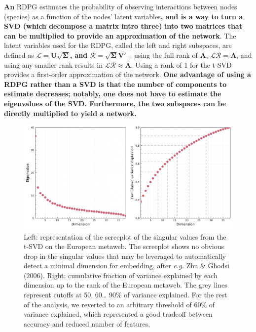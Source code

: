 \documentclass[11pt]{article}
\makeatletter
\def\maxwidth{\ifdim\Gin@nat@width>\linewidth\linewidth
\else\Gin@nat@width\fi}
\let\Oldincludegraphics\includegraphics
\renewcommand{\includegraphics}[1]{\Oldincludegraphics[width=\maxwidth]{#1}}
\providecommand{\DIFaddtex}[1]{{\bf #1}} %
\providecommand{\DIFdeltex}[1]{} %
\providecommand{\DIFaddbegin}{\protect\color{blue}} %
\providecommand{\DIFaddend}{\protect\color{black}} %
\providecommand{\DIFdelbegin}{\protect\color{red}} %
\providecommand{\DIFdelend}{\protect\color{black}} %
\providecommand{\DIFadd}[1]{\texorpdfstring{\DIFaddtex{#1}}{#1}} %
\providecommand{\DIFdel}[1]{\texorpdfstring{\DIFdeltex{#1}}{}} %
\newcommand{\DIFscaledelfig}{0.5}
\newlength{\DIFdelgraphicswidth} %
\newlength{\DIFdelgraphicsheight} %
\newcommand{\DIFaddincludegraphics}[2][]{{\color{blue}\fbox{\DIFOincludegraphics[#1]{#2}}}} %
\newcommand{\DIFdelincludegraphics}[2][]{%
\sbox{\DIFdelgraphicsbox}{\DIFOincludegraphics[#1]{#2}}%
\settoboxwidth{\DIFdelgraphicswidth}{\DIFdelgraphicsbox} %
\settoboxtotalheight{\DIFdelgraphicsheight}{\DIFdelgraphicsbox} %
\scalebox{\DIFscaledelfig}{%
\parbox[b]{\DIFdelgraphicswidth}{\usebox{\DIFdelgraphicsbox}\\[-\baselineskip] \rule{\DIFdelgraphicswidth}{0em}}\llap{\resizebox{\DIFdelgraphicswidth}{\DIFdelgraphicsheight}{%
\setlength{\unitlength}{\DIFdelgraphicswidth}%
\begin{picture}(1,1)%
\thicklines\linethickness{2pt} %
{\color[rgb]{1,0,0}\put(0,0){\framebox(1,1){}}}%
{\color[rgb]{1,0,0}\put(0,0){\line( 1,1){1}}}%
{\color[rgb]{1,0,0}\put(0,1){\line(1,-1){1}}}%
\end{picture}%
}\hspace*{3pt}}} %
} %
\DeclareRobustCommand{\DIFaddbegin}{\DIFOaddbegin \let\includegraphics\DIFaddincludegraphics} %
\DeclareRobustCommand{\DIFaddend}{\DIFOaddend \let\includegraphics\DIFOincludegraphics} %
\DeclareRobustCommand{\DIFdelbegin}{\DIFOdelbegin \let\includegraphics\DIFdelincludegraphics} %
\DeclareRobustCommand{\DIFdelend}{\DIFOaddend \let\includegraphics\DIFOincludegraphics} %
\makeatother
\begin{document}
\DIFdelbegin \DIFdel{A }\DIFdelend \DIFaddbegin \DIFadd{An }\DIFaddend RDPG estimates the probability of observing interactions between
nodes (species) as a function of the nodes' latent variables\DIFaddbegin \DIFadd{, and is a
way to turn a SVD (which decompose a matrix intro three) into two
matrices that can be multiplied to provide an approximation of the
network}\DIFaddend . The latent variables used for the RDPG, called the left and
right subspaces, are defined as
\DIFdelbegin \DIFdel{\(\mathscr{L} = \mathbf{L}\sqrt{\mathbf{\Sigma}}\), and
\(\mathscr{R} = \sqrt{\mathbf{\Sigma}}\mathbf{R}\) }\DIFdelend \DIFaddbegin \DIFadd{\(\mathscr{L} = \mathbf{U}\sqrt{\mathbf{\Sigma}}\), and
\(\mathscr{R} = \sqrt{\mathbf{\Sigma}}\mathbf{V}'\) }\DIFaddend -- using the full
rank of \(\mathbf{A}\), \DIFdelbegin \DIFdel{\(\mathscr{L}\mathscr{R}' = \mathbf{A}\)}\DIFdelend \DIFaddbegin \DIFadd{\(\mathscr{L}\mathscr{R} = \mathbf{A}\)}\DIFaddend , and
using any smaller rank results in
\DIFdelbegin \DIFdel{\(\mathscr{L}\mathscr{R}' \approx \mathbf{A}\)}\DIFdelend \DIFaddbegin \DIFadd{\(\mathscr{L}\mathscr{R} \approx \mathbf{A}\)}\DIFaddend . Using a rank of 1 for the
t-SVD provides a first-order approximation of the network. \DIFaddbegin \DIFadd{One advantage
of using a RDPG rather than a SVD is that the number of components to
estimate decreases; notably, one does not have to estimate the
eigenvalues of the SVD. Furthermore, the two subspaces can be directly
multiplied to yield a network.
}\DIFaddend 

\begin{figure}
\hypertarget{fig:scree}{%
\centering
\includegraphics{figures/figure-screeplot.png}
\caption{Left: representation of the screeplot of the singular values
from the t-SVD on the European metaweb. The screeplot shows no obvious
drop in the singular values that may be leveraged to automatically
detect a minimal dimension for embedding, after \emph{e.g.} Zhu \&
Ghodsi (2006). Right: cumulative fraction of variance explained by each
dimension up to the rank of the European metaweb. The grey lines
represent cutoffs at 50, 60\ldots{} 90\% of variance explained. For the
rest of the analysis, we reverted to an arbitrary threshold of 60\% of
variance explained, which represented a good tradeoff between accuracy
and reduced number of features.}\label{fig:scree}
}

\end{figure}
\end{document}
